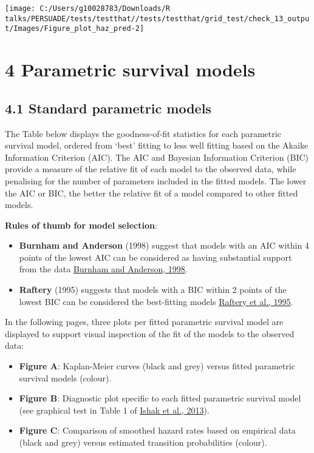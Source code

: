 \documentclass[
]{article}
\providecommand{\tightlist}{%
  \setlength{\itemsep}{0pt}\setlength{\parskip}{0pt}}
\begin{document}
\begin{flushleft}\texttt{[image: C:/Users/g10028783/Downloads/R talks/PERSUADE/tests/testthat//tests/testthat/grid\_test/check\_13\_output/Images/Figure\_plot\_haz\_pred-2]} \end{flushleft}

\clearpage

\section{4 Parametric survival models}\label{parametric-survival-models}

\subsection{4.1 Standard parametric
models}\label{standard-parametric-models}

The Table below displays the goodness-of-fit statistics for each
parametric survival model, ordered from `best' fitting to less well
fitting based on the Akaike Information Criterion (AIC). The AIC and
Bayesian Information Criterion (BIC) provide a measure of the relative
fit of each model to the observed data, while penalising for the number
of parameters included in the fitted models. The lower the AIC or BIC,
the better the relative fit of a model compared to other fitted models.

\textbf{Rules of thumb for model selection}:

\begin{itemize}
\tightlist
\item
  \textbf{Burnham and Anderson} (1998) suggest that models with an AIC
  within 4 points of the lowest AIC can be considered as having
  substantial support from the data
  \href{https://doi.org/10.1007/978-1-4757-2917-7}{Burnham and Anderson,
  1998}.\\
\item
  \textbf{Raftery} (1995) suggests that models with a BIC within 2
  points of the lowest BIC can be considered the best-fitting models
  \href{https://doi.org/10.2307/271063}{Raftery et al., 1995}.
\end{itemize}

In the following pages, three plots per fitted parametric survival model
are displayed to support visual inspection of the fit of the models to
the observed data:

\begin{itemize}
\tightlist
\item
  \textbf{Figure A}: Kaplan-Meier curves (black and grey) versus fitted
  parametric survival models (colour).\\
\item
  \textbf{Figure B}: Diagnostic plot specific to each fitted parametric
  survival model (see graphical test in Table 1 of
  \href{https://doi.org/10.1007/s40273-013-0064-3}{Ishak et al., 2013}).
\item
  \textbf{Figure C}: Comparison of smoothed hazard rates based on
  empirical data (black and grey) versus estimated transition
  probabilities (colour).
\end{itemize}
\end{document}
